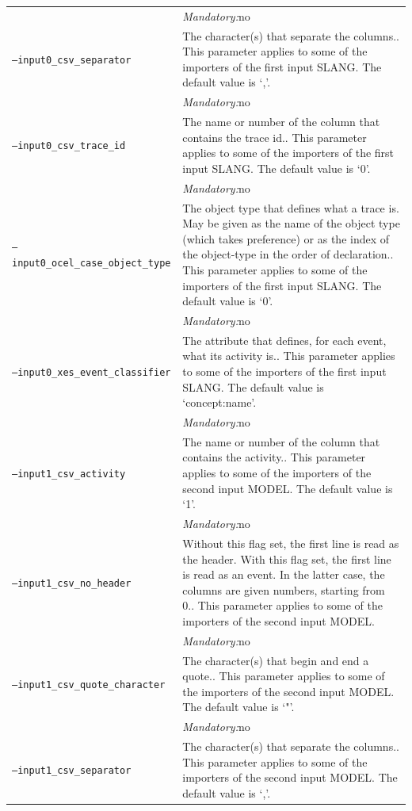 {\begin{tabularx}{\linewidth}{lX}
&\textit{Mandatory:}\quad no\\
\texttt{--input0\_csv\_separator} & The character(s) that separate the columns.. This parameter applies to some of the importers of the first input SLANG. The default value is `,'.\\
&\textit{Mandatory:}\quad no\\
\texttt{--input0\_csv\_trace\_id} & The name or number of the column that contains the trace id.. This parameter applies to some of the importers of the first input SLANG. The default value is `0'.\\
&\textit{Mandatory:}\quad no\\
\texttt{--input0\_ocel\_case\_object\_type} & The object type that defines what a trace is. May be given as the name of the object type (which takes preference) or as the index of the object-type in the order of declaration.. This parameter applies to some of the importers of the first input SLANG. The default value is `0'.\\
&\textit{Mandatory:}\quad no\\
\texttt{--input0\_xes\_event\_classifier} & The attribute that defines, for each event, what its activity is.. This parameter applies to some of the importers of the first input SLANG. The default value is `concept:name'.\\
&\textit{Mandatory:}\quad no\\
\texttt{--input1\_csv\_activity} & The name or number of the column that contains the activity.. This parameter applies to some of the importers of the second input MODEL. The default value is `1'.\\
&\textit{Mandatory:}\quad no\\
\texttt{--input1\_csv\_no\_header} & Without this flag set, the first line is read as the header. 
    With this flag set, the first line is read as an event. In the latter case, the columns are given numbers, starting from 0.. This parameter applies to some of the importers of the second input MODEL. \\
&\textit{Mandatory:}\quad no\\
\texttt{--input1\_csv\_quote\_character} & The character(s) that begin and end a quote.. This parameter applies to some of the importers of the second input MODEL. The default value is `"'.\\
&\textit{Mandatory:}\quad no\\
\texttt{--input1\_csv\_separator} & The character(s) that separate the columns.. This parameter applies to some of the importers of the second input MODEL. The default value is `,'.\\

\end{tabularx}}

